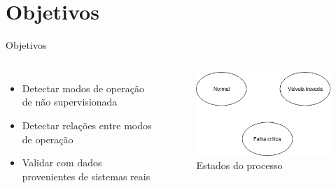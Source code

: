 \section{Objetivos}
\begin{frame}{Objetivos}
    \begin{columns}
        	\begin{itemize}
        	    \item Detectar modos de operação de não supervisionada
        	    \item Detectar relações entre modos de operação
        	    \item Validar com dados provenientes de sistemas reais
        	\end{itemize}
    	
        	\begin{figure}
        	    \centering
        	    \includegraphics[width=\textwidth,height=\textheight,keepaspectratio]{figuras/_grafo_yuri_no_edge.png}
        	    \caption{Estados do processo}
        	    \label{fig:estados}
        	\end{figure}
    \end{columns}
\end{frame}


